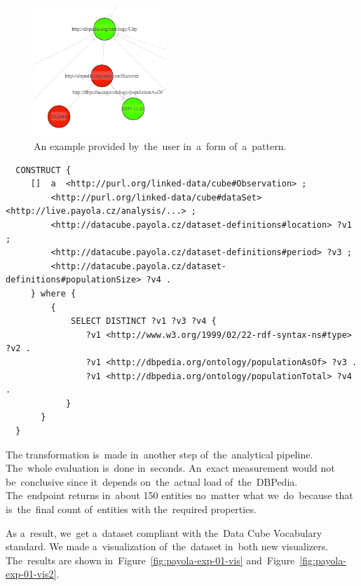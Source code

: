 \begin{figure}
  \centering
  \includegraphics[width=50mm]{img/payola-exp-01-selection.png}
  \caption{An example provided by~the~user in~a~form of~a~pattern.}
  \label{fig:payola-exp-01-selection}
\end{figure}

\scriptsize
\begin{verbatim}
  CONSTRUCT {
     []  a  <http://purl.org/linked-data/cube#Observation> ;
         <http://purl.org/linked-data/cube#dataSet> <http://live.payola.cz/analysis/...> ;
         <http://datacube.payola.cz/dataset-definitions#location> ?v1 ;
         <http://datacube.payola.cz/dataset-definitions#period> ?v3 ;
         <http://datacube.payola.cz/dataset-definitions#populationSize> ?v4 .
     } where {
         {
             SELECT DISTINCT ?v1 ?v3 ?v4 {
                ?v1 <http://www.w3.org/1999/02/22-rdf-syntax-ns#type> ?v2 .
                ?v1 <http://dbpedia.org/ontology/populationAsOf> ?v3 .
                ?v1 <http://dbpedia.org/ontology/populationTotal> ?v4 .
            }
       }
  } 
\end{verbatim}
\normalsize

\begin{sloppypar}
The transformation is~made in~another step of~the~analytical pipeline. The~whole evaluation is~done in~seconds. An~exact measurement would not be~conclusive since it~depends on~the~actual load of~the~DBPedia. The~endpoint 
returns in~about 150 entities no~matter what we~do~because that is~the~final
count of~entities with the~required properties.
\end{sloppypar}

As a~result, we~get a~dataset compliant with the~Data Cube Vocabulary standard. 
We made a~visualization of~the~dataset in~both new visualizers. The~results are 
shown in~Figure~\ref{fig:payola-exp-01-vis} and~Figure~\ref{fig:payola-exp-01-vis2}.

